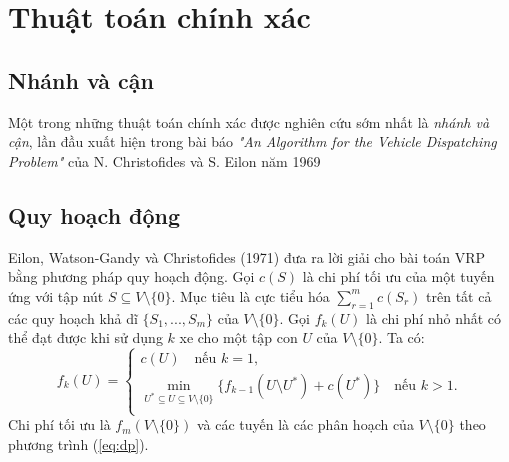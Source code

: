 \section{Thuật toán chính xác}

\subsection{Nhánh và cận}
Một trong những thuật toán chính xác được nghiên cứu sớm nhất là \textit{nhánh và cận}, lần đầu xuất hiện trong bài báo \textit{"An Algorithm for the Vehicle Dispatching Problem"} của N. Christofides và S. Eilon năm 1969 \cite{christofides1969algorithm} 

\subsection{Quy hoạch động}
Eilon, Watson-Gandy và Christofides (1971) \cite{christofides1969algorithm} đưa ra lời giải cho bài toán VRP bằng phương pháp quy hoạch động. Gọi $c(S)$ là chi phí tối ưu của một tuyến ứng với tập nút $S \subseteq V \setminus \{0\}$. Mục tiêu là cực tiểu hóa $\sum_{r=1}^{m} c(S_r)$ trên tất cả các quy hoạch khả dĩ $\{S_1,...,S_m\}$ của $V \setminus \{0\}$. Gọi $f_k(U)$ là chi phí nhỏ nhất có thể đạt được khi sử dụng $k$ xe cho một tập con $U$ của $V \setminus \{0\}$. Ta có:
\begin{equation}
  \label{eq:dp}
    f_k(U) = 
    \begin{cases}
      c(U) \quad \text{nếu } k = 1, \\
      \min_{U^* \subseteq U \subseteq V \setminus \{0\}} \{f_{k-1} (U \setminus U^*) + c(U^*)\} \quad \text{nếu } k > 1. \\
    \end{cases}
\end{equation}
Chi phí tối ưu là $f_m(V \setminus \{0\})$ và các tuyến là các phân hoạch của $V \setminus \{0\}$ theo phương trình (\ref{eq:dp}).


